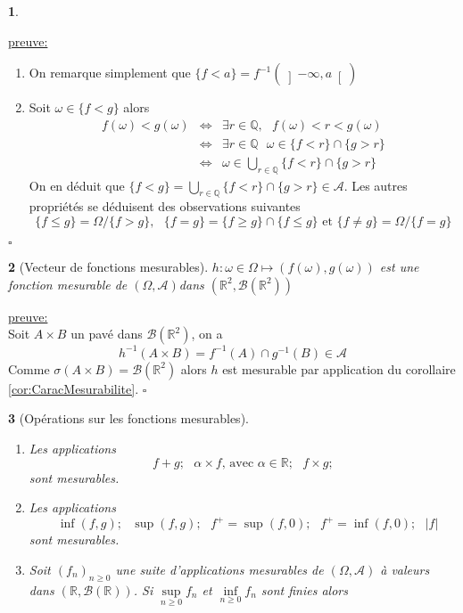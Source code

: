 \documentclass[8pt,notheorems]{beamer}
\def \R{\mathbb R}
\def \Om{\Omega}
\def \om{\omega}
\newtheorem{prop}{\translate{Proposition}}
\theoremstyle{definition}
\theoremstyle{example}
\theoremstyle{mystyle}
\theoremstyle{plain}
\begin{document}
\begin{frame}[allowframebreaks]
\begin{prop}
\begin{enumerate}
\end{enumerate}
\end{prop}
\flushleft
\underline{preuve:}\\
\begin{enumerate}
\item On remarque simplement que $\{f<a\}=f^{-1}(\left]-\infty,a\right[)$
\item Soit $\om\in \{f<g\}$ alors
\begin{eqnarray*}
f(\om)<g(\om)&\Leftrightarrow& \exists r\in\mathbb{Q},\text{ }f(\om)<r<g(\om)\\
&\Leftrightarrow& \exists r\in\mathbb{Q}\text{ } \om\in \{f<r\}\cap\{g>r\}\\
&\Leftrightarrow&   \om\in \bigcup_{r\in\mathbb{Q}}\{f<r\}\cap\{g>r\}
\end{eqnarray*}
On en déduit que $\{f<g\}=\bigcup_{r\in\mathbb{Q}}\{f<r\}\cap\{g>r\}\in\mathcal{A}$. Les autres propriétés se déduisent des observations suivantes
$$
\{f\leq g\}=\Om/\{f> g\},\text{ }\{f=g\}=\{f\geq g\}\cap\{f\leq g\}\text{ et }\{f\neq g\}=\Om/\{f= g\}
$$
\end{enumerate}
$\square$
\begin{prop}[Vecteur de fonctions mesurables]\label{prop:ComposeeVecteurMesurable}
$h:\omega\in\mathbb{\Omega}\mapsto (f(\omega),g(\omega))$ est une fonction mesurable de $(\Omega,\mathcal{A})$dans $\left(\mathbb{R}^{2},\mathcal{B}\left(\mathbb{R}^{2}\right)\right)$
\end{prop}
\underline{preuve:}\\
Soit $A\times B$ un pavé dans $\mathcal{B}(\mathbb{R}^{2})$, on a
$$
h^{-1}(A\times B)=f^{-1}(A)\cap g^{-1}(B)\in\mathcal{A}
$$
Comme $\sigma(A\times B)=\mathcal{B}(\R^{2})$ alors $h$ est mesurable par application du corollaire \ref{cor:CaracMesurabilite}.
$\square$\\
\begin{prop}[Opérations sur les fonctions mesurables]
\begin{enumerate}
    \item Les applications 
    $$
    f+g;\text{ }\alpha\times f\text{, avec }\alpha\in \R;\text{ }f\times g;
    $$
    sont mesurables.
    \item Les applications
    $$\text{ }\inf(f,g);\text{ }\sup(f,g);\text{ }f^+ = \sup(f,0);\text{ }f^+ = \inf(f,0);\text{ }|f|$$
    sont mesurables. 
    \item Soit $(f_n)_{n\geq0}$ une suite d'applications mesurables de $(\Omega,\mathcal{A})$ à valeurs dans $(\R,\mathcal{B}(\R))$. Si $\underset{n\geq 0}{\sup} f_n$ et $\underset{n\geq 0}{\inf} f_n$ sont finies alors 

\end{enumerate}
\end{prop}
\end{frame}
\end{document}
